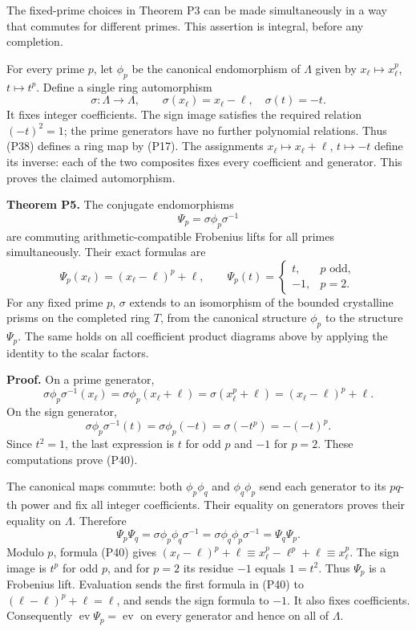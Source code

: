 \documentclass[
]{article}
\begin{document}
The fixed-prime choices in Theorem P3 can be made simultaneously in a
way that commutes for different primes. This assertion is integral,
before any completion.

For every prime \(p\), let \(\phi_p\) be the canonical endomorphism of
\(\Lambda\) given by \(x_\ell\mapsto x_\ell^p\), \(t\mapsto t^p\).
Define a single ring automorphism \[
\sigma:\Lambda\longrightarrow\Lambda,
\qquad \sigma(x_\ell)=x_\ell-\ell,\quad\sigma(t)=-t.
\tag{P38}
\] It fixes integer coefficients. The sign image satisfies the required
relation \((-t)^2=1\); the prime generators have no further polynomial
relations. Thus (P38) defines a ring map by (P17). The assignments
\(x_\ell\mapsto x_\ell+\ell\), \(t\mapsto-t\) define its inverse: each
of the two composites fixes every coefficient and generator. This proves
the claimed automorphism.

\textbf{Theorem P5.} The conjugate endomorphisms \[
\Psi_p=\sigma\phi_p\sigma^{-1}
\tag{P39}
\] are commuting arithmetic-compatible Frobenius lifts for all primes
simultaneously. Their exact formulas are \[
\Psi_p(x_\ell)=(x_\ell-\ell)^p+\ell,
\qquad
\Psi_p(t)=
\begin{cases}t,&p\text{ odd},\\-1,&p=2.\end{cases}
\tag{P40}
\] For any fixed prime \(p\), \(\sigma\) extends to an isomorphism of
the bounded crystalline prisms on the completed ring \(T\), from the
canonical structure \(\phi_p\) to the structure \(\Psi_p\). The same
holds on all coefficient product diagrams above by applying the identity
to the scalar factors.

\textbf{Proof.} On a prime generator, \[
\sigma\phi_p\sigma^{-1}(x_\ell)
=\sigma\phi_p(x_\ell+\ell)
=\sigma(x_\ell^p+\ell)
=(x_\ell-\ell)^p+\ell.
\] On the sign generator, \[
\sigma\phi_p\sigma^{-1}(t)
=\sigma\phi_p(-t)=\sigma(-t^p)=-(-t)^p.
\] Since \(t^2=1\), the last expression is \(t\) for odd \(p\) and
\(-1\) for \(p=2\). These computations prove (P40).

The canonical maps commute: both \(\phi_p\phi_q\) and \(\phi_q\phi_p\)
send each generator to its \(pq\)-th power and fix all integer
coefficients. Their equality on generators proves their equality on
\(\Lambda\). Therefore \[
\Psi_p\Psi_q=\sigma\phi_p\phi_q\sigma^{-1}
=\sigma\phi_q\phi_p\sigma^{-1}=\Psi_q\Psi_p.
\tag{P41}
\] Modulo \(p\), formula (P40) gives
\((x_\ell-\ell)^p+\ell\equiv x_\ell^p-\ell^p+\ell\equiv x_\ell^p\). The
sign image is \(t^p\) for odd \(p\), and for \(p=2\) its residue \(-1\)
equals \(1=t^2\). Thus \(\Psi_p\) is a Frobenius lift. Evaluation sends
the first formula in (P40) to \((\ell-\ell)^p+\ell=\ell\), and sends the
sign formula to \(-1\). It also fixes coefficients. Consequently
\(\operatorname{ev}\Psi_p=\operatorname{ev}\) on every generator and
hence on all of \(\Lambda\).
\end{document}
